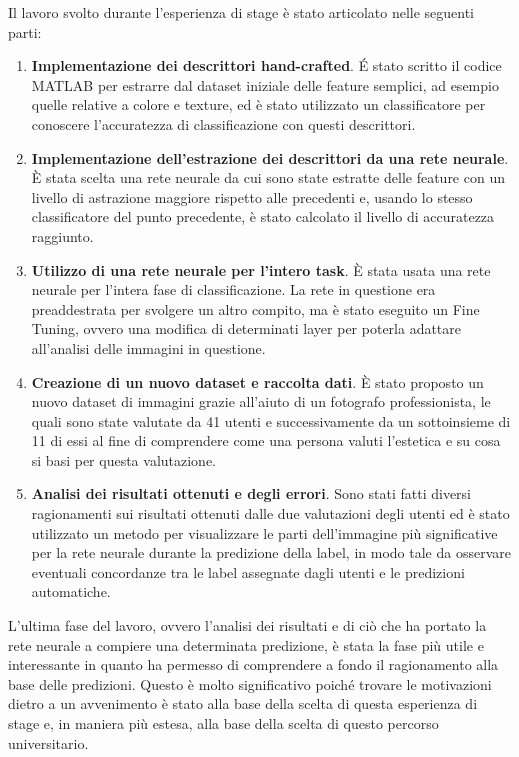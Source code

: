 Il lavoro svolto durante l'esperienza di stage è stato articolato nelle seguenti parti:
\begin{enumerate}
    \item \textbf{Implementazione dei descrittori hand-crafted}. É stato scritto il codice MATLAB per estrarre dal dataset iniziale delle feature semplici, ad esempio quelle relative a colore e texture, ed è stato utilizzato un classificatore per conoscere l'accuratezza di classificazione con questi descrittori.
    \item \textbf{Implementazione dell'estrazione dei descrittori da una rete neurale}. È stata scelta una rete neurale da cui sono state estratte delle feature con un livello di astrazione maggiore rispetto alle precedenti e, usando lo stesso classificatore del punto precedente, è stato calcolato il livello di accuratezza raggiunto.
    \item \textbf{Utilizzo di una rete neurale per l'intero task}. È stata usata una rete neurale per l'intera fase di classificazione. La rete in questione era preaddestrata per svolgere un altro compito, ma è stato eseguito un Fine Tuning, ovvero una modifica di determinati layer per poterla adattare all'analisi delle immagini in questione.
    \item \textbf{Creazione di un nuovo dataset e raccolta dati}. È stato proposto un nuovo dataset di immagini grazie all'aiuto di un fotografo professionista, le quali sono state valutate da 41 utenti e successivamente da un sottoinsieme di 11 di essi al fine di comprendere come una persona valuti l'estetica e su cosa si basi per questa valutazione.
    \item \textbf{Analisi dei risultati ottenuti e degli errori}. Sono stati fatti diversi ragionamenti sui risultati ottenuti dalle due valutazioni degli utenti ed è stato utilizzato un metodo per visualizzare le parti dell'immagine più significative per la rete neurale durante la predizione della label, in modo tale da osservare eventuali concordanze tra le label assegnate dagli utenti e le predizioni automatiche.
\end{enumerate}

L'ultima fase del lavoro, ovvero l'analisi dei risultati e di ciò che ha portato la rete neurale a compiere una determinata predizione, è stata la fase più utile e interessante in quanto ha permesso di comprendere a fondo il ragionamento alla base delle predizioni. Questo è molto significativo poiché trovare le motivazioni dietro a un avvenimento è stato alla base della scelta di questa esperienza di stage e, in maniera più estesa, alla base della scelta di questo percorso universitario.

